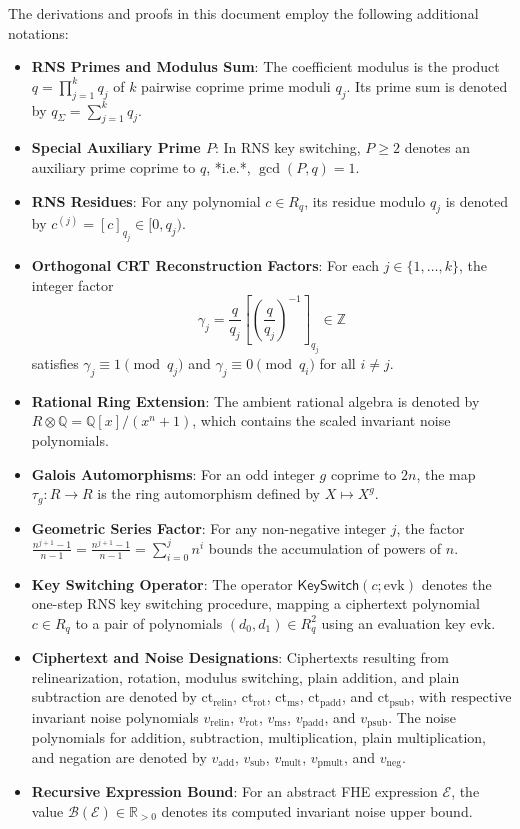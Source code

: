 \documentclass[11pt]{article}
\theoremstyle{definition}
\theoremstyle{remark}
\newcommand{\ctrelin}{\mathrm{ct}_{\mathrm{relin}}}
\newcommand{\vrelin}{v_{\mathrm{relin}}}
\newcommand{\ctrot}{\mathrm{ct}_{\mathrm{rot}}}
\newcommand{\vrot}{v_{\mathrm{rot}}}
\newcommand{\ctms}{\mathrm{ct}_{\mathrm{ms}}}
\newcommand{\vms}{v_{\mathrm{ms}}}
\newcommand{\vadd}{v_{\mathrm{add}}}
\newcommand{\ctpadd}{\mathrm{ct}_{\mathrm{padd}}}
\newcommand{\vpadd}{v_{\mathrm{padd}}}
\newcommand{\ctpsub}{\mathrm{ct}_{\mathrm{psub}}}
\newcommand{\vpsub}{v_{\mathrm{psub}}}
\newcommand{\vmult}{v_{\mathrm{mult}}}
\newcommand{\vpmult}{v_{\mathrm{pmult}}}
\newcommand{\vneg}{v_{\mathrm{neg}}}
\newcommand{\vsub}{v_{\mathrm{sub}}}
\newcommand{\KS}{\mathsf{KeySwitch}}
\newcommand{\Sgeo}[1]{\frac{n^{#1+1}-1}{n-1}}
\begin{document}
The derivations and proofs in this document employ the following additional notations:
\begin{itemize}[leftmargin=2em]
\item \textbf{RNS Primes and Modulus Sum}: The coefficient modulus is the product $q = \prod_{j=1}^k q_j$ of $k$ pairwise coprime prime moduli $q_j$.
Its prime sum is denoted by $q_\Sigma = \sum_{j=1}^k q_j$.
\item \textbf{Special Auxiliary Prime $P$}: In RNS key switching, $P \geq 2$ denotes an auxiliary prime coprime to $q$, *i.e.*, $\gcd(P, q) = 1$.
\item \textbf{RNS Residues}: For any polynomial $c \in R_q$, its residue modulo $q_j$ is denoted by $c^{(j)} = [c]_{q_j} \in [0, q_j)$.
\item \textbf{Orthogonal CRT Reconstruction Factors}: For each $j \in \{1, \dots, k\}$, the integer factor
\[
  \gamma_j = \frac{q}{q_j}\left[\left(\frac{q}{q_j}\right)^{-1}\right]_{q_j} \in \mathbb{Z}
\]
satisfies $\gamma_j \equiv 1 \pmod{q_j}$ and $\gamma_j \equiv 0 \pmod{q_i}$ for all $i \neq j$.
\item \textbf{Rational Ring Extension}: The ambient rational algebra is denoted by $R \otimes \mathbb{Q} = \mathbb{Q}[x]/(x^n+1)$, which contains the scaled invariant noise polynomials.
\item \textbf{Galois Automorphisms}: For an odd integer $g$ coprime to $2n$, the map $\tau_g\colon R \to R$ is the ring automorphism defined by $X \mapsto X^g$.
\item \textbf{Geometric Series Factor}: For any non-negative integer $j$, the factor $\Sgeo{j} = \frac{n^{j+1}-1}{n-1} = \sum_{i=0}^j n^i$ bounds the accumulation of powers of $n$.
\item \textbf{Key Switching Operator}: The operator $\KS(c; \mathrm{evk})$ denotes the one-step RNS key switching procedure, mapping a ciphertext polynomial $c \in R_q$ to a pair of polynomials $(d_0, d_1) \in R_q^2$ using an evaluation key $\mathrm{evk}$.
\item \textbf{Ciphertext and Noise Designations}: Ciphertexts resulting from relinearization, rotation, modulus switching, plain addition, and plain subtraction are denoted by $\ctrelin$, $\ctrot$, $\ctms$, $\ctpadd$, and $\ctpsub$, with respective invariant noise polynomials $\vrelin$, $\vrot$, $\vms$, $\vpadd$, and $\vpsub$.
The noise polynomials for addition, subtraction, multiplication, plain multiplication, and negation are denoted by $\vadd$, $\vsub$, $\vmult$, $\vpmult$, and $\vneg$.
\item \textbf{Recursive Expression Bound}: For an abstract FHE expression $\mathcal{E}$, the value $\mathcal{B}(\mathcal{E}) \in \mathbb{R}_{>0}$ denotes its computed invariant noise upper bound.
\end{itemize}
\end{document}
